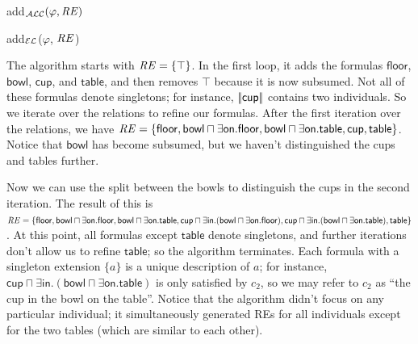 \begin{algorithm}[t]
\caption{add$_\mathcal{ALC}(\varphi,\mathit{RE})$}
\label{algo:bisim-add-alc}
\end{algorithm}
%
\begin{algorithm}[t]
\dontprintsemicolon
\caption{add$_\mathcal{EL}$($\varphi$, $\mathit{RE}$)}
\label{algo:bisim-add-el}
\end{algorithm}

The algorithm starts with $\mathit{RE} = \{\top\}$.  In the first loop, it
adds the formulas $\mathsf{floor}$, $\mathsf{bowl}$, $\mathsf{cup}$,
and $\mathsf{table}$, and then removes $\top$ because it is now
subsumed.  Not all of these formulas denote singletons; for instance,
$|\!|\mathsf{cup}|\!|$ contains two individuals.  So we iterate over
the relations to refine our formulas.  After the first iteration over
the relations, we have $\mathit{RE} = \{ \mathsf{floor}, \mathsf{bowl} \sqcap
\exists \mathsf{on}.\mathsf{floor}, \mathsf{bowl} \sqcap \exists
\mathsf{on}.\mathsf{table}, \mathsf{cup}, \mathsf{table} \}$. Notice
that $\mathsf{bowl}$ has become subsumed, but we haven't distinguished
the cups and tables further.

Now we can use the split between the bowls to distinguish the cups in
the second iteration.  The result of this is $\mathit{RE} = \{ \mathsf{floor},
\mathsf{bowl} \sqcap \exists \mathsf{on}.\mathsf{floor}, \mathsf{bowl}
\sqcap \exists \mathsf{on}.\mathsf{table}, \mathsf{cup} \sqcap \exists
\mathsf{in}. (\mathsf{bowl} \sqcap \exists
\mathsf{on}.\mathsf{floor}), \mathsf{cup} \sqcap \exists
\mathsf{in}. (\mathsf{bowl} \sqcap \exists
\mathsf{on}.\mathsf{table}), \mathsf{table} \}$.  At this point, all
formulas except $\mathsf{table}$ denote singletons, and further
iterations don't allow us to refine $\mathsf{table}$; so the algorithm
terminates.  Each formula with a singleton extension $\{a\}$ is a
unique description of $a$; for instance, $\mathsf{cup} \sqcap \exists
\mathsf{in}. (\mathsf{bowl} \sqcap \exists
\mathsf{on}.\mathsf{table})$ is only satisfied by $c_2$, so we may
refer to $c_2$ as ``the cup in the bowl on the table''.  Notice that
the algorithm didn't focus on any particular individual; it
simultaneously generated REs for all individuals except for the two
tables (which are similar to each other).

